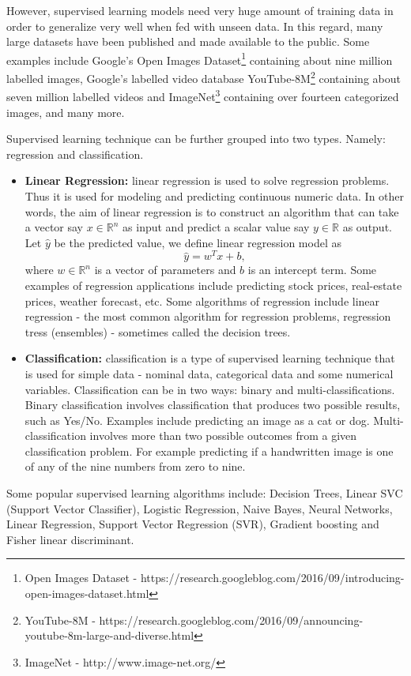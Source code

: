 \documentclass[master]{thesis-uestc}
\begin{document}
However, supervised learning models need very huge amount of training data in order to generalize very well when fed with unseen data. In this regard, many large datasets have been published and made available to the public. Some examples include Google's Open Images Dataset\footnote{Open Images Dataset - https://research.googleblog.com/2016/09/introducing-open-images-dataset.html} containing about nine million labelled images, Google's labelled video database YouTube-8M\footnote{YouTube-8M - https://research.googleblog.com/2016/09/announcing-youtube-8m-large-and-diverse.html} containing about seven million labelled videos and ImageNet\footnote{ImageNet - http://www.image-net.org/} containing over fourteen categorized images, and many more.

Supervised learning technique can be further grouped into two types. Namely: regression and classification.
\begin{itemize}
    \item\textbf{Linear Regression:} linear regression is used to solve regression problems. Thus it is used for modeling and predicting continuous numeric data. In other words, the aim of linear regression is to construct an algorithm that can take a vector say $x \in \mathbb{R}^n$ as input and predict a scalar value say $y \in  \mathbb{R}$ as output. Let $\hat{y}$ be the predicted value, we define linear regression model as
    \begin{equation}
        \hat{y} = w^Tx + b,
    \end{equation}
    where $w \in \mathbb{R}^n$ is a vector of parameters and $b$ is an intercept term. Some examples of regression applications include predicting stock prices, real-estate prices, weather forecast, etc. Some algorithms of regression include linear regression - the most common algorithm for regression problems, regression tress (ensembles) - sometimes called the decision trees.
    \item\textbf{Classification:} classification is a type of supervised learning technique that is used for simple data - nominal data, categorical data and some numerical variables. Classification can be in two ways: binary and multi-classifications. Binary classification involves classification that produces two possible results, such as Yes/No. Examples include predicting an image as a cat or dog. Multi-classification involves more than two possible outcomes from a given classification problem. For example predicting if a handwritten image is one of any of the nine numbers from zero to nine. 
\end{itemize}
Some popular supervised learning algorithms include: Decision Trees, Linear SVC (Support Vector Classifier), Logistic Regression, Naive Bayes, Neural Networks, Linear Regression, Support Vector Regression (SVR), Gradient boosting and Fisher linear discriminant. 
\end{document}
